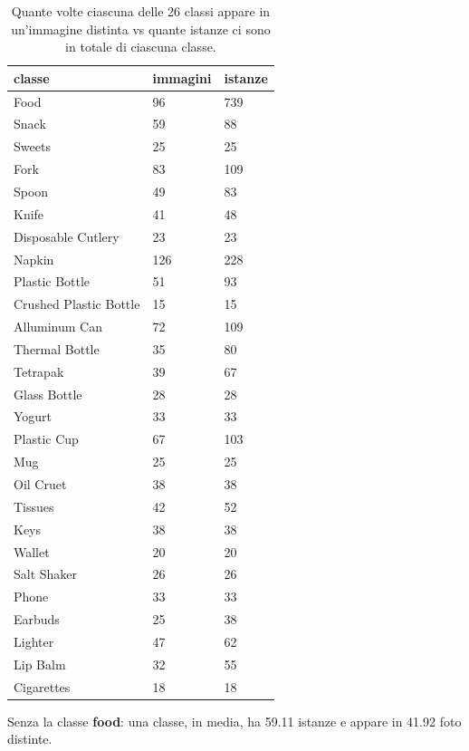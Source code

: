 \documentclass[../main.tex]{subfiles}
\begin{document}
\begin{table}[h!]
    \centering
    \caption{Quante volte ciascuna delle 26 classi appare in un'immagine distinta vs quante istanze ci sono in totale di ciascuna classe.}
    \label{tab:cardinalities}
    \begin{tabular}{|l|l|l|}
        \hline
        \textbf{classe} & \textbf{immagini} & \textbf{istanze} \\ \hline
        Food & 96 & 739 \\ \hline
        Snack & 59 & 88 \\ \hline
        Sweets & 25 & 25 \\ \hline
        Fork & 83 & 109 \\ \hline
        Spoon & 49 & 83 \\ \hline
        Knife & 41 & 48 \\ \hline
        Disposable Cutlery & 23 & 23 \\ \hline
        Napkin & 126 & 228 \\ \hline
        Plastic Bottle & 51 & 93 \\ \hline
        Crushed Plastic Bottle & 15 & 15 \\ \hline
        Alluminum Can & 72 & 109 \\ \hline
        Thermal Bottle & 35 & 80 \\ \hline
        Tetrapak & 39 & 67 \\ \hline
        Glass Bottle & 28 & 28 \\ \hline
        Yogurt & 33 & 33 \\ \hline
        Plastic Cup & 67 & 103 \\ \hline
        Mug & 25 & 25 \\ \hline
        Oil Cruet & 38 & 38 \\ \hline
        Tissues & 42 & 52 \\ \hline
        Keys & 38 & 38 \\ \hline
        Wallet & 20 & 20 \\ \hline
        Salt Shaker & 26 & 26 \\ \hline
        Phone & 33 & 33 \\ \hline
        Earbuds & 25 & 38 \\ \hline
        Lighter & 47 & 62 \\ \hline
        Lip Balm & 32 & 55 \\ \hline
        Cigarettes & 18 & 18 \\ \hline
    \end{tabular}
    \begin{tablenotes}
        \small
        \item[1] Senza la classe \textbf{food}: una classe, in media, ha 59.11 istanze e appare in 41.92 foto distinte.
    \end{tablenotes}
\end{table}
\end{document}
